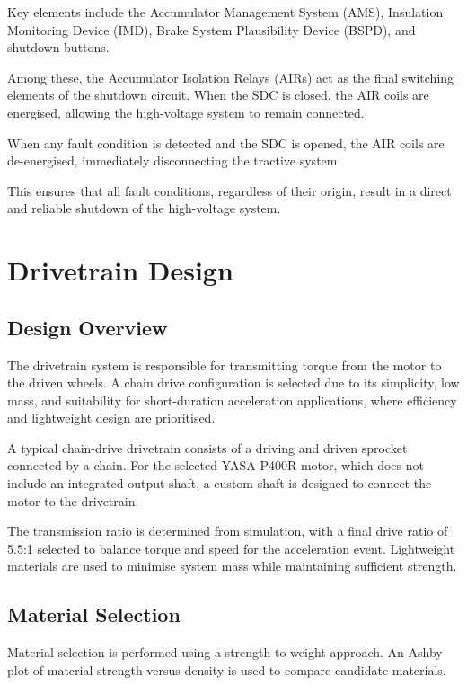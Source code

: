 \documentclass[11pt, a4paper]{report}
\numberwithin{equation}{section}
\begin{document}
Key elements include the Accumulator Management System (AMS), Insulation Monitoring Device (IMD), Brake System Plausibility Device (BSPD), and shutdown buttons.

Among these, the Accumulator Isolation Relays (AIRs) act as the final switching elements of the shutdown circuit. When the SDC is closed, the AIR coils are energised, allowing the high-voltage system to remain connected.


When any fault condition is detected and the SDC is opened, the AIR coils are de-energised, immediately disconnecting the tractive system.

This ensures that all fault conditions, regardless of their origin, result in a direct and reliable shutdown of the high-voltage system.

\section{Drivetrain Design}

\subsection{Design Overview}

The drivetrain system is responsible for transmitting torque from the motor to the driven wheels. A chain drive configuration is selected due to its simplicity, low mass, and suitability for short-duration acceleration applications, where efficiency and lightweight design are prioritised.

A typical chain-drive drivetrain consists of a driving and driven sprocket connected by a chain. For the selected YASA P400R motor, which does not include an integrated output shaft, a custom shaft is designed to connect the motor to the drivetrain.

The transmission ratio is determined from simulation, with a final drive ratio of 5.5:1 selected to balance torque and speed for the acceleration event. Lightweight materials are used to minimise system mass while maintaining sufficient strength.


\subsection{Material Selection}

Material selection is performed using a strength-to-weight approach. An Ashby plot of material strength versus density is used to compare candidate materials.
\end{document}
